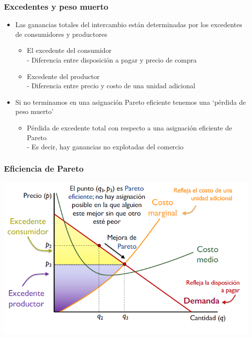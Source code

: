 \documentclass{beamer}
\begin{document}
\begin{frame}
\frametitle{Excedentes y peso muerto}
\begin{itemize}
    \item Las ganancias totales del intercambio están determinadas por los excedentes de consumidores y productores\vspace{2mm}
    \begin{itemize}
        \item El excedente del consumidor \\ - Diferencia entre disposición a pagar y precio de compra\vspace{1mm}
        \item Excedente del productor \\ - Diferencia entre precio y costo de una unidad adicional\vspace{4mm}
    \end{itemize}
    \item Si no terminamos en una asignación Pareto eficiente tenemos una ‘pérdida de peso muerto’\vspace{2mm}
    \begin{itemize}
        \item Pérdida de excedente total con respecto a una asignación eficiente de Pareto \\
        - Es decir, hay ganancias no explotadas del comercio
    \end{itemize}
    \end{itemize}
\end{frame}



\begin{frame}
\frametitle{Eficiencia de Pareto}
\includegraphics[scale=0.6]{../Figures/Tema_06.40_excedente3.png}
\end{frame}
\end{document}

